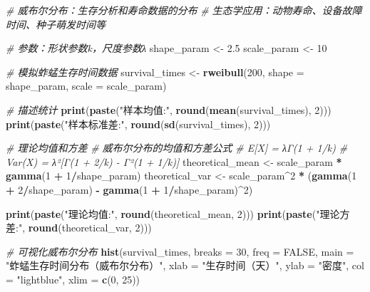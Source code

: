 \documentclass[
  twoside]{book}
\newenvironment{Shaded}{\begin{snugshade}}{\end{snugshade}}
\newcommand{\AttributeTok}[1]{\textcolor[rgb]{0.13,0.29,0.53}{#1}}
\newcommand{\CommentTok}[1]{\textcolor[rgb]{0.56,0.35,0.01}{\textit{#1}}}
\newcommand{\ConstantTok}[1]{\textcolor[rgb]{0.56,0.35,0.01}{#1}}
\newcommand{\DecValTok}[1]{\textcolor[rgb]{0.00,0.00,0.81}{#1}}
\newcommand{\FloatTok}[1]{\textcolor[rgb]{0.00,0.00,0.81}{#1}}
\newcommand{\FunctionTok}[1]{\textcolor[rgb]{0.13,0.29,0.53}{\textbf{#1}}}
\newcommand{\NormalTok}[1]{#1}
\newcommand{\OtherTok}[1]{\textcolor[rgb]{0.56,0.35,0.01}{#1}}
\newcommand{\SpecialCharTok}[1]{\textcolor[rgb]{0.81,0.36,0.00}{\textbf{#1}}}
\newcommand{\StringTok}[1]{\textcolor[rgb]{0.31,0.60,0.02}{#1}}
\begin{document}
\begin{Shaded}
\begin{Highlighting}[]
\CommentTok{\# 威布尔分布：生存分析和寿命数据的分布}
\CommentTok{\# 生态学应用：动物寿命、设备故障时间、种子萌发时间等}

\CommentTok{\# 参数：形状参数k，尺度参数λ}
\NormalTok{shape\_param }\OtherTok{\textless{}{-}} \FloatTok{2.5}
\NormalTok{scale\_param }\OtherTok{\textless{}{-}} \DecValTok{10}

\CommentTok{\# 模拟蚱蜢生存时间数据}
\NormalTok{survival\_times }\OtherTok{\textless{}{-}} \FunctionTok{rweibull}\NormalTok{(}\DecValTok{200}\NormalTok{, }\AttributeTok{shape =}\NormalTok{ shape\_param, }\AttributeTok{scale =}\NormalTok{ scale\_param)}

\CommentTok{\# 描述统计}
\FunctionTok{print}\NormalTok{(}\FunctionTok{paste}\NormalTok{(}\StringTok{"样本均值:"}\NormalTok{, }\FunctionTok{round}\NormalTok{(}\FunctionTok{mean}\NormalTok{(survival\_times), }\DecValTok{2}\NormalTok{)))}
\FunctionTok{print}\NormalTok{(}\FunctionTok{paste}\NormalTok{(}\StringTok{"样本标准差:"}\NormalTok{, }\FunctionTok{round}\NormalTok{(}\FunctionTok{sd}\NormalTok{(survival\_times), }\DecValTok{2}\NormalTok{)))}

\CommentTok{\# 理论均值和方差}
\CommentTok{\# 威布尔分布的均值和方差公式}
\CommentTok{\# E[X] = λΓ(1 + 1/k)}
\CommentTok{\# Var(X) = λ²[Γ(1 + 2/k) {-} Γ²(1 + 1/k)]}
\NormalTok{theoretical\_mean }\OtherTok{\textless{}{-}}\NormalTok{ scale\_param }\SpecialCharTok{*} \FunctionTok{gamma}\NormalTok{(}\DecValTok{1} \SpecialCharTok{+} \DecValTok{1}\SpecialCharTok{/}\NormalTok{shape\_param)}
\NormalTok{theoretical\_var }\OtherTok{\textless{}{-}}\NormalTok{ scale\_param}\SpecialCharTok{\^{}}\DecValTok{2} \SpecialCharTok{*}\NormalTok{ (}\FunctionTok{gamma}\NormalTok{(}\DecValTok{1} \SpecialCharTok{+} \DecValTok{2}\SpecialCharTok{/}\NormalTok{shape\_param) }\SpecialCharTok{{-}} \FunctionTok{gamma}\NormalTok{(}\DecValTok{1} \SpecialCharTok{+} \DecValTok{1}\SpecialCharTok{/}\NormalTok{shape\_param)}\SpecialCharTok{\^{}}\DecValTok{2}\NormalTok{)}

\FunctionTok{print}\NormalTok{(}\FunctionTok{paste}\NormalTok{(}\StringTok{"理论均值:"}\NormalTok{, }\FunctionTok{round}\NormalTok{(theoretical\_mean, }\DecValTok{2}\NormalTok{)))}
\FunctionTok{print}\NormalTok{(}\FunctionTok{paste}\NormalTok{(}\StringTok{"理论方差:"}\NormalTok{, }\FunctionTok{round}\NormalTok{(theoretical\_var, }\DecValTok{2}\NormalTok{)))}

\CommentTok{\# 可视化威布尔分布}
\FunctionTok{hist}\NormalTok{(survival\_times, }\AttributeTok{breaks =} \DecValTok{30}\NormalTok{, }\AttributeTok{freq =} \ConstantTok{FALSE}\NormalTok{,}
     \AttributeTok{main =} \StringTok{"蚱蜢生存时间分布（威布尔分布）"}\NormalTok{,}
     \AttributeTok{xlab =} \StringTok{"生存时间（天）"}\NormalTok{, }\AttributeTok{ylab =} \StringTok{"密度"}\NormalTok{,}
     \AttributeTok{col =} \StringTok{"lightblue"}\NormalTok{, }\AttributeTok{xlim =} \FunctionTok{c}\NormalTok{(}\DecValTok{0}\NormalTok{, }\DecValTok{25}\NormalTok{))}


\end{Highlighting}
\end{Shaded}
\end{document}
